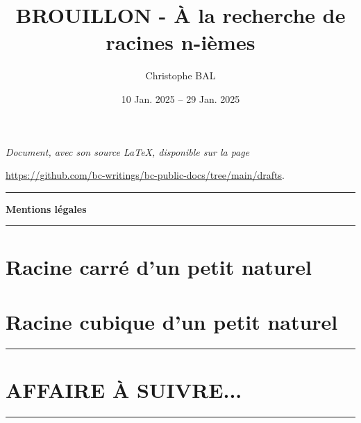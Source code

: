 \documentclass[12pt]{amsart}
\theoremstyle{method}
\begin{document}
\title{BROUILLON - À la recherche de racines n-ièmes}
\author{Christophe BAL}
\date{10 Jan. 2025 -- 29 Jan. 2025}

\maketitle

\begin{center}
	\itshape
	Document, avec son source \LaTeX, disponible sur la page

	\url{https://github.com/bc-writings/bc-public-docs/tree/main/drafts}.
\end{center}


\bigskip


\begin{center}
	\hrule\vspace{.3em}
	{
		\fontsize{1.35em}{1em}\selectfont
		\textbf{Mentions \og légales \fg}
	}

	\vspace{0.45em}
	\doclicenseThis
	\hrule
\end{center}


\setcounter{tocdepth}{2}
\tableofcontents


\newpage
\section{Racine carré d'un petit naturel}




\section{Racine cubique d'un petit naturel}




\bigskip

\hrule

\section{AFFAIRE À SUIVRE...}

\bigskip

\hrule
\end{document}
